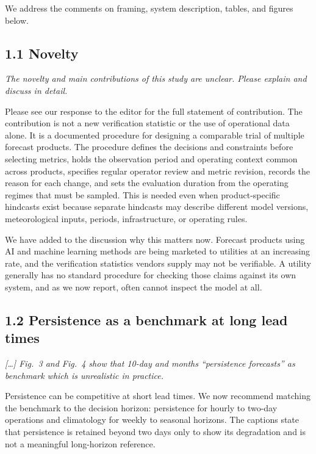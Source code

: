 \documentclass[11pt]{article}
\newenvironment{rc}%
  {\begin{list}{}{\setlength{\leftmargin}{1.5em}\setlength{\rightmargin}{1.5em}%
   \setlength{\topsep}{0.2em}\setlength{\parsep}{0pt}\setlength{\itemsep}{0pt}}%
   \item[]\itshape\color{quotegray}}%
  {\end{list}}
\begin{document}
We address the comments on framing, system description, tables, and figures below.


\subsection*{1.1 Novelty}

\begin{rc}
The novelty and main contributions of this study are unclear. Please explain and
discuss in detail.
\end{rc}

Please see our response to the editor for the full statement of contribution. The contribution
is not a new verification statistic or the use of operational data alone. It is a documented
procedure for designing a comparable trial of multiple forecast products. The procedure defines
the decisions and constraints before selecting metrics, holds the observation period and operating
context common across products, specifies regular operator review and metric revision, records
the reason for each change, and sets the evaluation duration from the operating regimes that must
be sampled. This is needed even when product-specific hindcasts exist because separate hindcasts
may describe different model versions, meteorological inputs, periods, infrastructure, or operating
rules.

We have added to the discussion why this matters now. Forecast products using AI and
machine learning methods are being marketed to utilities at an increasing rate, and the
verification statistics vendors supply may not be verifiable. A utility generally has no
standard procedure for checking those claims against its own system, and as we now
report, often cannot inspect the model at all.

\subsection*{1.2 Persistence as a benchmark at long lead times}

\begin{rc}
[\ldots] Fig.\ 3 and Fig.\ 4 show that 10-day and months ``persistence forecasts'' as
benchmark which is unrealistic in practice.
\end{rc}

Persistence can be competitive at short lead times. We now recommend matching the benchmark
to the decision horizon: persistence for hourly to two-day operations and climatology for
weekly to seasonal horizons. The captions state that persistence is retained beyond two days
only to show its degradation and is not a meaningful long-horizon reference.
\end{document}
